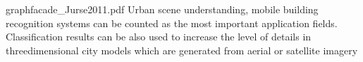 graphfacade_Jurse2011.pdf
 Urban scene understanding, mobile building recognition systems can be counted as the most important application ﬁelds. Classiﬁcation results can be also used to increase the level of details in threedimensional city models which are generated from aerial or satellite imagery
